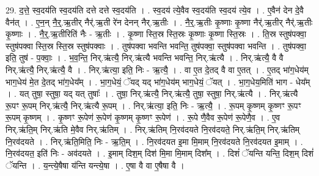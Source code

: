\documentclass[17pt]{extarticle}
\begin{document}
29. द॒त्ते॒ स्व॒दय॑ति स्व॒दय॑ति दत्ते दत्ते स्व॒दय॑ति । . स्व॒दय॑ त्ये॒वैव स्व॒दय॑ति स्व॒दय॑ त्ये॒व । . ए॒वैन॑ देन दे॒वै वैन॑त् । . ए॒न॒न् नै॒र्॒.ऋ॒तीर् नैर्॑.ऋ॒ती रे॑न देनन् नैर्.ऋ॒तीः । . नै॒र्॒.ऋ॒तीः कृ॒ष्णाः कृ॒ष्णा नैर्॑.ऋ॒तीर् नैर्॑.ऋ॒तीः कृ॒ष्णाः । . नै॒र्॒.ऋ॒तीरिति॑ नैः - ऋ॒तीः । . कृ॒ष्णा स्ति॒स्र स्ति॒स्रः कृ॒ष्णाः कृ॒ष्णा स्ति॒स्रः । . ति॒स्र स्तुष॑पक्वा॒ स्तुष॑पक्वा स्ति॒स्र स्ति॒स्र स्तुष॑पक्वाः । . तुष॑पक्वा भवन्ति भवन्ति॒ तुष॑पक्वा॒ स्तुष॑पक्वा भवन्ति । . तुष॑पक्वा॒ इति॒ तुष॑ - प॒क्वाः॒ । . भ॒व॒न्ति॒ निर्.ऋ॑त्यै॒ निर्.ऋ॑त्यै भवन्ति भवन्ति॒ निर्.ऋ॑त्यै । . निर्.ऋ॑त्यै॒ वै वै निर्.ऋ॑त्यै॒ निर्.ऋ॑त्यै॒ वै । . निर्.ऋ॑त्या॒ इति॒ निः - ऋ॒त्यै॒ । . वा ए॒त दे॒तद् वै वा ए॒तत् । . ए॒तद् भा॑ग॒धेय॑म् भाग॒धेय॑ मे॒त दे॒तद् भा॑ग॒धेय᳚म् । . भा॒ग॒धेयं॒ ॅयद् यद् भा॑ग॒धेय॑म् भाग॒धेयं॒ ॅयत् । . भा॒ग॒धेय॒मिति॑ भाग - धेय᳚म् । . यत् तुषा॒ स्तुषा॒ यद् यत् तुषाः᳚ । . तुषा॒ निर्.ऋ॑त्यै॒ निर्.ऋ॑त्यै॒ तुषा॒ स्तुषा॒ निर्.ऋ॑त्यै । . निर्.ऋ॑त्यै रू॒पꣳ रू॒पम् निर्.ऋ॑त्यै॒ निर्.ऋ॑त्यै रू॒पम् । . निर्.ऋ॑त्या॒ इति॒ निः - ऋ॒त्यै॒ । . रू॒पम् कृ॒ष्णम् कृ॒ष्णꣳ रू॒पꣳ रू॒पम् कृ॒ष्णम् । . कृ॒ष्णꣳ रू॒पेण॑ रू॒पेण॑ कृ॒ष्णम् कृ॒ष्णꣳ रू॒पेण॑ । . रू॒पे णै॒वैव रू॒पेण॑ रू॒पेणै॒व । . ए॒व निर्.ऋ॑ति॒म् निर्.ऋ॑ति मे॒वैव निर्.ऋ॑तिम् । . निर्.ऋ॑तिम् नि॒रव॑दयते नि॒रव॑दयते॒ निर्.ऋ॑ति॒म् निर्.ऋ॑तिम् नि॒रव॑दयते । . निर्.ऋ॑ति॒मिति॒ निः - ऋ॒ति॒म् । . नि॒रव॑दयत इ॒मा मि॒माम् नि॒रव॑दयते नि॒रव॑दयत इ॒माम् । . नि॒रव॑दयत॒ इति॑ निः - अव॑दयते । . इ॒माम् दिश॒म् दिश॑ मि॒मा मि॒माम् दिश᳚म् । . दिशं॑ ॅयन्ति यन्ति॒ दिश॒म् दिशं॑ ॅयन्ति । . य॒न्त्ये॒षैषा य॑न्ति यन्त्ये॒षा । . ए॒षा वै वा ए॒षैषा वै । \newline
\end{document}
